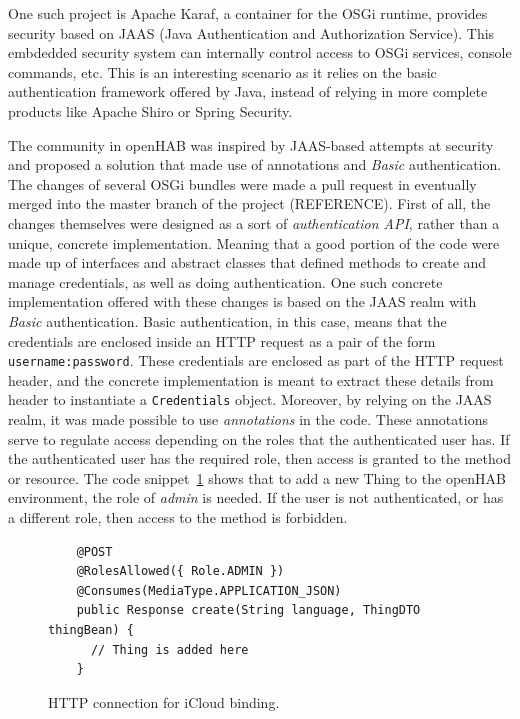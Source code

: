 \documentclass[12pt]{article}
\begin{document}
One such project is Apache Karaf, a container for the OSGi runtime, provides security based on JAAS (Java Authentication and Authorization Service). This embdedded security system can internally control access to OSGi services, console commands, etc. This is an interesting scenario as it relies on the basic authentication framework offered by Java, instead of relying in more complete products like Apache Shiro or Spring Security.

The community in openHAB was inspired by JAAS-based attempts at security and proposed a solution that made use of annotations and \emph{Basic} authentication. The changes of several OSGi bundles were made a pull request in eventually merged into the master branch of the project (REFERENCE). First of all, the changes themselves were designed as a sort of \emph{authentication API}, rather than a unique, concrete implementation. Meaning that a good portion of the code were made up of interfaces and abstract classes that defined methods to create and manage credentials, as well as doing authentication. One such concrete implementation offered with these changes is based on the JAAS realm with \emph{Basic} authentication. Basic authentication, in this case, means that the credentials are enclosed inside an HTTP request as a pair of the form \texttt{username:password}. These credentials are enclosed as part of the HTTP request header, and the concrete implementation is meant to extract these details from header to instantiate a \texttt{Credentials} object. Moreover, by relying on the JAAS realm, it was made possible to use \emph{annotations} in the code. These annotations serve to regulate access depending on the roles that the authenticated user has. If the authenticated user has the required role, then access is granted to the method or resource. The code snippet~\ref{lst:jaas_roles} shows that to add a new Thing to the openHAB environment, the role of \emph{admin} is needed. If the user is not authenticated, or has a different role, then access to the method is forbidden. 

\begin{figure} [htb]
\begin{lstlisting}
    @POST
    @RolesAllowed({ Role.ADMIN })
    @Consumes(MediaType.APPLICATION_JSON)
    public Response create(String language, ThingDTO thingBean) {
      // Thing is added here
    }
\end{lstlisting}
\caption{HTTP connection for iCloud binding.}
\label{lst:jaas_roles}
\end{figure}
\end{document}
